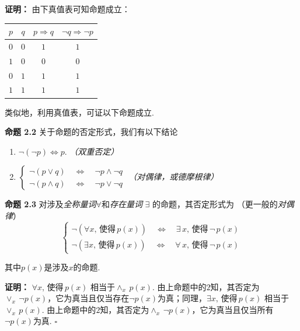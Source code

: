 \documentclass{article}
\begin{document}
\textbf{证明：} 由下真值表可知命题成立：

\begin{center}
    \begin{tabular}{c|c|c|c}
        $p$ & $q$ & $p\Rightarrow q$ & $\neg q\Rightarrow \neg p$\\
\hline
       $0$ & $0$ & $1$ & $1$\\
       \hline
       $1$ & $0$  & $0$ & $0$\\
        \hline
       $0$ & $1$  & $1$ & $1$\\
        \hline
       $1$ & $1$ & $1$ & $1$\\
    \end{tabular}
\end{center}

类似地，利用真值表，可证以下命题成立.

\vspace{3pt}

\textbf{命题 2.2} 关于命题的否定形式，我们有以下结论
\begin{enumerate}
    \item $\neg(\neg p)\Longleftrightarrow p$. \textit{（双重否定）}
    \item $\left\{\begin{array}{c}
          \neg (p\lor q)\quad \Longleftrightarrow \quad \neg p\land \neg q \\
          \neg(p\land q)\quad \Longleftrightarrow \quad \neg p\lor \neg q
    \end{array}\right.$ \textit{（对偶律，或德摩根律）}   
\end{enumerate}

\textbf{命题 2.3} 对涉及\textit{全称量词}$\forall$和\textit{存在量词} $\exists$ 的命题，其否定形式为 （更一般的\textit{对偶律}）\[\left\{\begin{array}{c}
        \neg(\forall x,\,\textit{使得}\,p(x))\quad \Longleftrightarrow\quad 
    \exists\,x,\,\textit{使得}\,\neg\,p(x)  \\
     \neg(\exists x,\,\textit{使得}\,p(x))\quad \Longleftrightarrow\quad 
    \forall\,x,\,\textit{使得}\,\neg\,p(x)
    \end{array}\right.\]

其中$p(x)$是涉及$x$的命题.

\vspace{3pt}

\textbf{证明：} $\forall x,\,\textit{使得}\,p(x)$ 相当于$\land_{x}\,p(x)$. 由上命题中的$2$知，其否定为$\lor_{x}\,\neg p(x)$，它为真当且仅当存在$\neg p(x)$为真；同理，$\exists x,\,\textit{使得}\,p(x)$ 相当于$\lor_{x}\,p(x)$. 由上命题中的$2$知，其否定为$\land_{x}\,\neg p(x)$，它为真当且仅当所有$\neg p(x)$为真. \qquad$\square$
\end{document}
